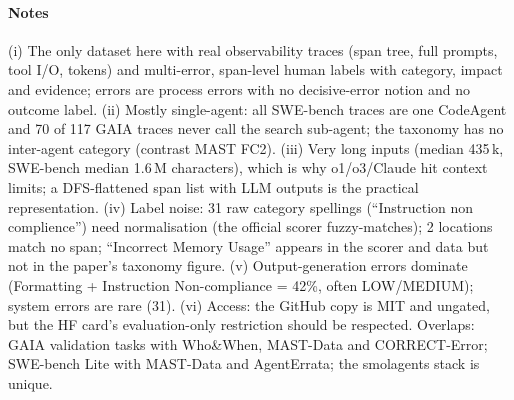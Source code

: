 \paragraph{Notes} (i) The only dataset here with real observability traces (span tree, full prompts, tool I/O, tokens) and multi-error, span-level human labels with category, impact and evidence; errors are process errors with no decisive-error notion and no outcome label. (ii) Mostly single-agent: all SWE-bench traces are one CodeAgent and 70 of 117 GAIA traces never call the search sub-agent; the taxonomy has no inter-agent category (contrast MAST FC2). (iii) Very long inputs (median 435\,k, SWE-bench median 1.6\,M characters), which is why o1/o3/Claude hit context limits; a DFS-flattened span list with LLM outputs is the practical representation. (iv) Label noise: 31 raw category spellings (``Instruction non complience'') need normalisation (the official scorer fuzzy-matches); 2 locations match no span; ``Incorrect Memory Usage'' appears in the scorer and data but not in the paper's taxonomy figure. (v) Output-generation errors dominate (Formatting + Instruction Non-compliance = 42\%, often LOW/MEDIUM); system errors are rare (31). (vi) Access: the GitHub copy is MIT and ungated, but the HF card's evaluation-only restriction should be respected. Overlaps: GAIA validation tasks with Who\&When, MAST-Data and CORRECT-Error; SWE-bench Lite with MAST-Data and AgentErrata; the smolagents stack is unique.
